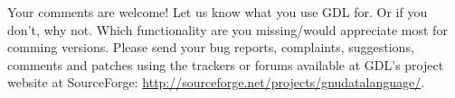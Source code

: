 Your comments are welcome! Let us know what you use GDL for. Or if you don't, why not. 
Which functionality are you missing/would appreciate most for comming versions.
Please send your bug reports, complaints, suggestions, comments and patches 
  using the trackers or forums available at GDL's project website at SourceForge:
  \url{http://sourceforge.net/projects/gnudatalanguage/}.
